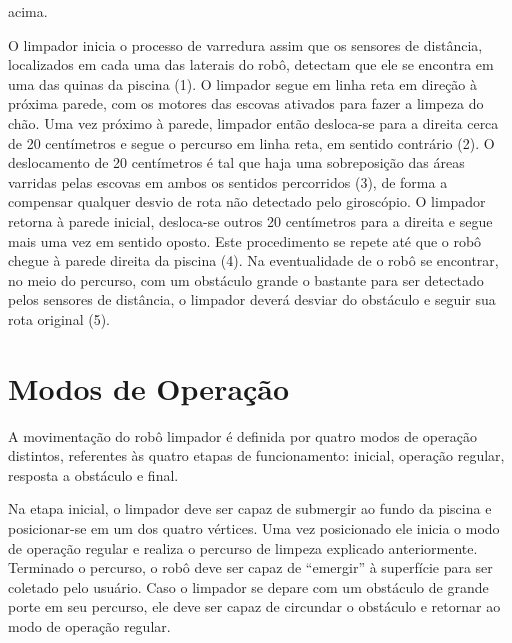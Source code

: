 acima.
\par
O limpador inicia o processo de varredura assim que os sensores de distância,
localizados em cada uma das laterais do robô, detectam que ele se encontra em
uma das quinas da piscina (1).  O limpador segue em linha reta em direção à
próxima parede, com os motores das escovas ativados para fazer a limpeza do chão.
Uma vez próximo à parede, limpador então desloca-se para a direita cerca de 20
centímetros e segue o percurso em linha reta, em sentido contrário (2). O deslocamento
de 20 centímetros é tal que haja uma sobreposição das áreas varridas pelas escovas
em ambos os sentidos percorridos (3), de forma a compensar qualquer desvio de
rota não detectado pelo giroscópio. O limpador retorna à parede inicial, desloca-se
outros 20 centímetros para a direita  e segue mais uma vez em sentido oposto. Este
procedimento se repete até que o robô chegue à parede direita da piscina (4). Na
eventualidade de o robô se encontrar, no meio do percurso,  com um obstáculo grande
o bastante para ser detectado pelos sensores de distância, o limpador deverá desviar
do obstáculo e seguir sua rota original (5).

\section{Modos de Operação}
A movimentação do robô limpador é definida por quatro modos de operação distintos,
referentes às quatro etapas de funcionamento: inicial, operação regular,
resposta a obstáculo e final.
\par
Na etapa inicial, o limpador deve ser capaz de submergir ao fundo da piscina e
posicionar-se em um dos quatro vértices. Uma vez posicionado ele inicia o modo
de operação regular e realiza o percurso de limpeza  explicado anteriormente.
Terminado o percurso, o robô deve ser capaz de “emergir” à superfície para ser
coletado pelo usuário. Caso o limpador se depare com um obstáculo de grande porte
em seu percurso, ele deve ser capaz de circundar o obstáculo e retornar ao modo de
operação regular.

